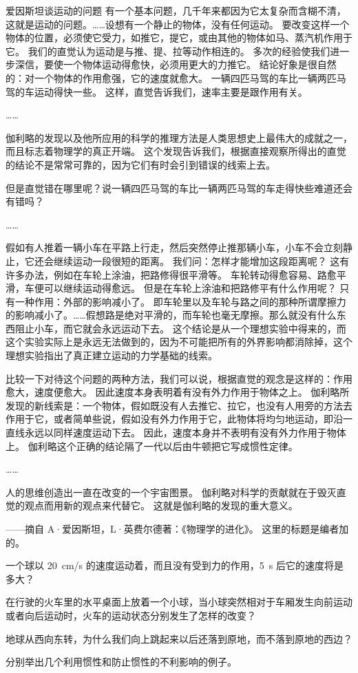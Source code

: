 \begin{Reading}{爱因斯坦谈运动的问题}
有一个基本问题，几千年来都因为它太复杂而含糊不清，这就是运动的问题。……设想有一个静止的物体，没有任何运动。
要改变这样一个物体的位置，必须使它受力，如推它，提它，或由其他的物体如马、蒸汽机作用于它。
我们的直觉认为运动是与推、提、拉等动作相连的。
多次的经验使我们进一步深信，要使一个物体运动得愈快，必须用更大的力推它。
结论好象是很自然的：对一个物体的作用愈强，它的速度就愈大。
一辆四匹马驾的车比一辆两匹马驾的车运动得快一些。
这样，直觉告诉我们，速率主要是跟作用有关。

……

伽利略的发现以及他所应用的科学的推理方法是人类思想史上最伟大的成就之一，而且标志着物理学的真正开端。
这个发现告诉我们，根据直接观察所得出的直觉的结论不是常常可靠的，因为它们有时会引到错误的线索上去。

但是直觉错在哪里呢？说一辆四匹马驾的车比一辆两匹马驾的车走得快些难道还会有错吗？

……

假如有人推着一辆小车在平路上行走，然后突然停止推那辆小车，小车不会立刻静止，它还会继续运动一段很短的距离。
我们问：怎样才能增加这段距离呢？
这有许多办法，例如在车轮上涂油，把路修得很平滑等。
车轮转动得愈容易、路愈平滑，车便可以继续运动得愈远。
但是在车轮上涂油和把路修平有什么作用呢？
只有一种作用：外部的影响减小了。
即车轮里以及车轮与路之间的那种所谓摩擦力的影响减小了。……假想路是绝对平滑的，而车轮也毫无摩擦。那么就没有什么东西阻止小车，而它就会永远运动下去。
这个结论是从一个理想实验中得来的，而这个实验实际上是永远无法做到的，因为不可能把所有的外界影响都消除掉，这个理想实验指出了真正建立运动的力学基础的线索。

比较一下对待这个问题的两种方法，我们可以说，根据直觉的观念是这样的：作用愈大，速度便愈大。
因此速度本身表明着有没有外力作用于物体之上。
伽利略所发现的新线索是：一个物体，假如既没有人去推它、拉它，也没有人用旁的方法去作用于它，或者简单些说，假如没有外力作用于它，此物体将均匀地运动，即沿一直线永远以同样速度运动下去。
因此，速度本身并不表明有没有外力作用于物体上。
伽利略这个正确的结论隔了一代以后由牛顿把它写成惯性定律。

……

人的思维创造出一直在改变的一个宇宙图景。
伽利略对科学的贡献就在于毁灭直觉的观点而用新的观点来代替它。
这就是伽利略的发现的重大意义。


——摘自 A·爱因斯坦，L·英费尔德著：《物理学的进化》。
这里的标题是编者加的。
\end{Reading}

\begin{Practice}
\begin{question}
	 \item 一个球以 \qty{20}{cm/s} 的速度运动着，而且没有受到力的作用，\qty{5}{s} 后它的速度将是多大？
	 \item 在行驶的火车里的水平桌面上放着一个小球，当小球突然相对于车厢发生向前运动或者向后运动时，火车的运动状态分别发生了怎样的改变？
	 \item 地球从西向东转，为什么我们向上跳起来以后还落到原地，而不落到原地的西边？
	 \item 分别举出几个利用惯性和防止惯性的不利影响的例子。
\end{question}
\end{Practice}

